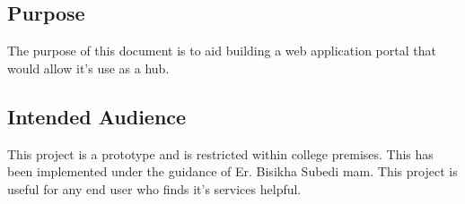 \documentclass{article}
\begin{document}
\subsection{Purpose}
The purpose of this document is to aid building a web application portal that would allow it's use as a hub.

\subsection{Intended Audience}
This project is a prototype and is restricted within college premises. This has been implemented under the guidance of Er. Bisikha Subedi mam. This project is useful for any end user who finds it's services helpful.
\end{document}
